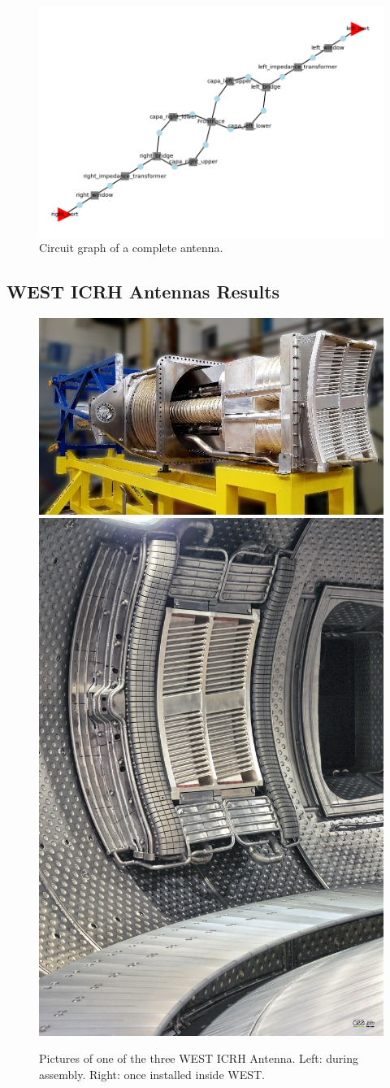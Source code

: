 {\begin{figure}
	\centering
	\includegraphics[width=.95\linewidth]{figures/chap3/WEST_ICRH/antenna_graph}
	\caption{Circuit graph of a complete antenna.}
	\label{fig:antenna_graph}
\end{figure}


\clearpage

\subsection{WEST ICRH Antennas Results}

\begin{figure}
	\centering
	\includegraphics[width=0.69\linewidth]{figures/chap3/WEST_ICRH/WEST_ICRH_antenna_picture}	\includegraphics[width=0.29\linewidth]{figures/chap3/WEST_ICRH/WEST_ICRH_antenna_inside_WEST}
	\caption{Pictures of one of the three WEST ICRH Antenna. Left: during assembly. Right: once installed inside WEST.}
	\label{fig:westicrhantennapicture}
\end{figure}

}
